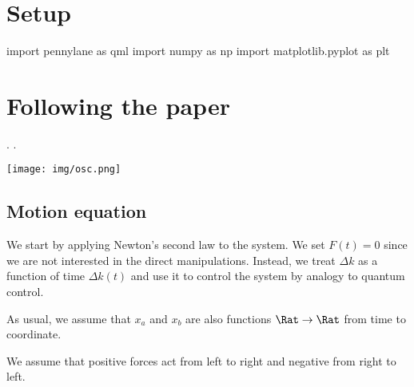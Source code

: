\newcommand{\dk}[0]{\Delta k(t)}
\newcommand{\K}[0]{\kappa}
\newcommand{\Oc}[0]{\Omega_c}
\newcommand{\Oz}[0]{\Omega_0}
\newcommand{\Od}[0]{\Omega_d(t)}
\newcommand{\xp}[0]{x_+}
\newcommand{\xm}[0]{x_-}
\newcommand{\Op}[0]{\Omega_{+}}
\newcommand{\Om}[0]{\Omega_{-}}
\newcommand{\Opm}[0]{\Omega_{\pm}}
\newcommand{\Omp}[0]{\Omega_{\mp}}
\newcommand{\dO}[0]{\Delta\Omega}
\newcommand{\od}[0]{\omega_d(t)}
\renewcommand{\a}[0]{a(t)}
\renewcommand{\b}[0]{b(t)}
\newcommand{\odr}[0]{\omega_{drive}}
\newcommand{\ar}[0]{\overline{a}(t)}
\newcommand{\br}[0]{\overline{b}(t)}


\section{Setup}


\begin{python}
import pennylane as qml
import numpy as np
import matplotlib.pyplot as plt
\end{python}

\begin{comment}
\begin{result}
\end{result}
\end{comment}

\newpage

\section{Following the paper}

\ls {}.
\li {}.
\le

\begin{center}
  \texttt{[image: img/osc.png]}
\end{center}

\subsection{Motion equation}

We start by applying Newton's second law to the system. We set \(F(t) = 0\) since we are not
interested in the direct manipulations. Instead, we treat \(\Delta k\) as a function of time $\dk$
and use it to control the system by analogy to quantum control.

As usual, we assume that $x_a$ and $x_b$ are also functions $\Rat \to \Rat$ from time to coordinate.

We assume that positive forces act from left to right and negative from right to left.

